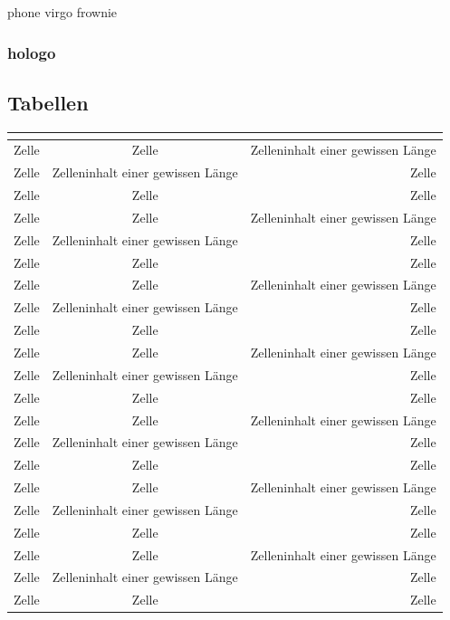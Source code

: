\documentclass[ngerman]{scrartcl}
\begin{document}
	phone \phone{}
	virgo \virgo{}
	frownie \frownie{}

	\subsubsection{hologo}


	\subsection{Tabellen}

	\begin{longtabu}[l]{@{}lcr@{}}
		\toprule
		\label{tab:tab}\\
		\midrule
		Zelle & Zelle & Zelleninhalt einer gewissen Länge\\
		Zelle & Zelleninhalt einer gewissen Länge & Zelle\\
		Zelle & Zelle & Zelle\\
		Zelle & Zelle & Zelleninhalt einer gewissen Länge\\
		Zelle & Zelleninhalt einer gewissen Länge & Zelle\\
		Zelle & Zelle & Zelle\\
		Zelle & Zelle & Zelleninhalt einer gewissen Länge\\
		Zelle & Zelleninhalt einer gewissen Länge & Zelle\\
		Zelle & Zelle & Zelle\\
		Zelle & Zelle & Zelleninhalt einer gewissen Länge\\
		Zelle & Zelleninhalt einer gewissen Länge & Zelle\\
		Zelle & Zelle & Zelle\\
		Zelle & Zelle & Zelleninhalt einer gewissen Länge\\
		Zelle & Zelleninhalt einer gewissen Länge & Zelle\\
		Zelle & Zelle & Zelle\\
		Zelle & Zelle & Zelleninhalt einer gewissen Länge\\
		Zelle & Zelleninhalt einer gewissen Länge & Zelle\\
		Zelle & Zelle & Zelle\\
		Zelle & Zelle & Zelleninhalt einer gewissen Länge\\
		Zelle & Zelleninhalt einer gewissen Länge & Zelle\\
		Zelle & Zelle & Zelle\\

\end{longtabu}
\end{document}

